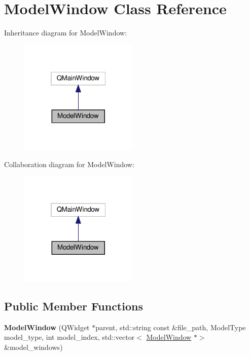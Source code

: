 \hypertarget{classModelWindow}{}\section{Model\+Window Class Reference}
\label{classModelWindow}


Inheritance diagram for Model\+Window\+:\nopagebreak
\begin{figure}[H]
\begin{center}
\leavevmode
\includegraphics[width=160pt]{classModelWindow__inherit__graph}
\end{center}
\end{figure}


Collaboration diagram for Model\+Window\+:\nopagebreak
\begin{figure}[H]
\begin{center}
\leavevmode
\includegraphics[width=160pt]{classModelWindow__coll__graph}
\end{center}
\end{figure}
\subsection*{Public Member Functions}
\begin{DoxyCompactItemize}
\item 
\mbox{\label{classModelWindow_a6035f5f05a539e4bc3593837e60c700f}} 
{\bfseries Model\+Window} (Q\+Widget $\ast$parent, std\+::string const \&file\+\_\+path, Model\+Type model\+\_\+type, int model\+\_\+index, std\+::vector$<$ \hyperlink{classModelWindow}{Model\+Window} $\ast$$>$ \&model\+\_\+windows)
\end{DoxyCompactItemize}


